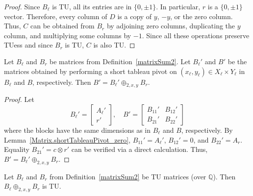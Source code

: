 \begin{proof}
    \leanok
    Since $B_{\ell}$ is TU, all its entries are in $\{0, \pm 1\}$. In particular, $r$ is a $\{0, \pm 1\}$ vector. Therefore, every column of $D$ is a copy of $y$, $-y$, or the zero column. Thus, $C$ can be obtained from $B_{r}$ by adjoining zero columns, duplicating the $y$ column, and multiplying some columns by $-1$. Since all these operations preserve TUess and since $B_{r}$ is TU, $C$ is also TU.
\end{proof}

\begin{lemma}
    \label{matrixSum2_shortTableauPivot}
    \leanok
    Let $B_{\ell}$ and $B_{r}$ be matrices from Definition~\ref{matrixSum2}. Let $B_{\ell}'$ and $B'$ be the matrices obtained by performing a short tableau pivot on $(x_{\ell}, y_{\ell}) \in X_{\ell} \times Y_{\ell}$ in $B_{\ell}$ and $B$, respectively. Then $B' = B_{\ell}' \oplus_{2, x, y} B_{r}$.
\end{lemma}

\begin{proof}
    \leanok
    Let
    \[
        B_{\ell}' = \begin{bmatrix} A_{\ell}' \\ r' \end{bmatrix}, \quad
        B' = \begin{bmatrix} B_{11}' & B_{12}' \\ B_{21}' & B_{22}' \end{bmatrix}
    \]
    where the blocks have the same dimensions as in $B_{\ell}$ and $B$, respectively. By Lemma~\ref{Matrix.shortTableauPivot_zero}, $B_{11}' = A_{\ell}'$, $B_{12}' = 0$, and $B_{22}' = A_{r}$. Equality $B_{21}' = c \otimes r'$ can be verified via a direct calculation. Thus, $B' = B_{\ell}' \oplus_{2, x, y} B_{r}$.
\end{proof}

\begin{lemma}
    \label{matrixSum2_isTotallyUnimodular}
    \leanok
    Let $B_{\ell}$ and $B_{r}$ from Definition~\ref{matrixSum2} be TU matrices (over $\mathbb{Q}$). Then $B_{\ell} \oplus_{2, x, y} B_{r}$ is TU.
\end{lemma}

